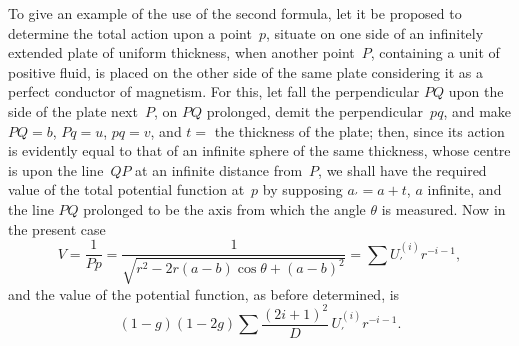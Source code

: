 \documentclass[12pt,notitlepage]{amsart}
\begin{document}
To give an example of the use of the second formula, let it be proposed
to determine the total action upon a point~$p$,
situate on one side of an infinitely
extended plate of uniform thickness, when another point~$P$, containing a unit
of positive fluid, is placed on the other side of the same plate
considering it as
a perfect conductor of magnetism. For this,
let fall the perpendicular $PQ$ upon
the side of the plate next~$P$, on $PQ$ prolonged,
demit the perpendicular~$pq$,
and make $PQ=b$, $Pq=u$, $pq=v$, and $t=$ the thickness of the plate;
then, since its action is evidently equal to that of an infinite sphere of the
same thickness, whose centre is upon the line~$QP$ at an infinite distance
from~$P$, we shall have the required value
of the total potential function at~$p$
by supposing $a_\prime=a+t$, $a$ infinite,
and the line $PQ$ prolonged to be the
axis from which the angle $\theta$ is measured. Now in the present case
\[
V=\frac{1}{Pp}
=\frac{1}{\sqrt{r^2-2r(a-b)\cos\theta+(a-b)^2}}
=\sum U_\prime^{(i)}r^{-i-1},
\]
and the value of the potential function, as before determined, is
\[
(1-g)(1-2g)\sum\frac{(2i+1)^2}{D}\,U_\prime^{(i)}r^{-i-1}.
\]
\end{document}

